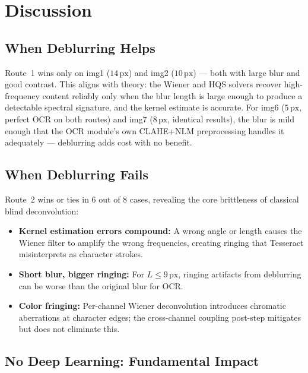 \documentclass[12pt,a4paper]{article}
\begin{document}
\section{Discussion}

\subsection{When Deblurring Helps}

Route~1 wins only on img1 ($14\,\mathrm{px}$) and img2 ($10\,\mathrm{px}$) --- both with
large blur and good contrast. This aligns with theory: the Wiener and HQS solvers
recover high-frequency content reliably only when the blur length is large enough to
produce a detectable spectral signature, and the kernel estimate is accurate.
For img6 ($5\,\mathrm{px}$, perfect OCR on both routes) and img7 ($8\,\mathrm{px}$,
identical results), the blur is mild enough that the OCR module's own CLAHE+NLM
preprocessing handles it adequately --- deblurring adds cost with no benefit.

\subsection{When Deblurring Fails}

Route~2 wins or ties in 6 out of 8 cases, revealing the core brittleness of classical
blind deconvolution:
\begin{itemize}[noitemsep, topsep=2pt]
  \item \textbf{Kernel estimation errors compound:} A wrong angle or length causes the
    Wiener filter to amplify the wrong frequencies, creating ringing that Tesseract
    misinterprets as character strokes.
  \item \textbf{Short blur, bigger ringing:} For $L \leq 9\,\mathrm{px}$, ringing
    artifacts from deblurring can be worse than the original blur for OCR.
  \item \textbf{Color fringing:} Per-channel Wiener deconvolution introduces chromatic
    aberrations at character edges; the cross-channel coupling post-step mitigates but
    does not eliminate this.
\end{itemize}

\subsection{No Deep Learning: Fundamental Impact}
\end{document}
